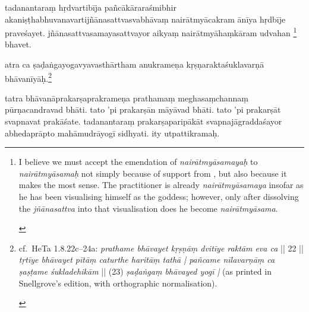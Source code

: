 \documentclass[naipra.tex]{subfiles}
\begin{document}
\begin{sanskrit}
\pstart
tadanantaraṃ hṛdvartibīja pañcākāraraśmibhir akaniṣṭhabhuvanavartijñānasattvasvabhāvaṃ nairātmyācakram ānīya hṛdbīje praveśayet.
jñānasattvasamayasattvayor aikyaṃ  nairātmyāhaṃkāram udvahan \footnote{\begin{english}
	I believe we must accept the emendation of \emph{nairātmyāsamayaḥ} to \emph{nairātmyāsamaḥ} not simply because of support from \TIB , but also because it makes the most sense.
	The practitioner is already \emph{nairātmyāsamaya} insofar as he has been visualising himself as the goddess; however, only after dissolving the \emph{jñānasattva} into that visualisation does he become \emph{nairātmyāsama}.
\end{english}} bhavet. 
\pend


\pstart
atra ca ṣaḍaṅgayogavyavasthārtham anukrameṇa kṛṣṇaraktaśuklavarṇā bhāvanīyāḥ.\footnote{\begin{english}
	cf.\ HeTa 1.8.22c–24a: \emph{prathame bhāvayet kṛṣṇāṃ dvitīye raktām eva ca} || 22 || \emph{tṛtīye bhāvayet pītāṃ caturthe haritāṃ tathā | pañcame nīlavarṇāṃ ca ṣaṣṭame śukladehikām }|| (23) \emph{ṣaḍaṅgaṃ bhāvayed yogī |} (as printed in Snellgrove's edition, with orthographic normalisation).
\end{english}} 
\pend



\pstart
tatra bhāvanāprakarṣaprakrameṇa prathamaṃ meghasaṃchannaṃ pūrṇacandravad bhāti.
tato 'pi prakarṣān māyāvad bhāti.
tato 'pi prakarṣāt svapnavat prakāśate.
tadanantaraṃ prakarṣaparipākāt svapnajāgraddaśayor abhedaprāpto mahāmudrāyogī sidhyati.
ity utpattikramaḥ. 
\pend


\end{sanskrit}
\end{document}
